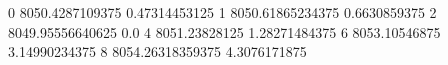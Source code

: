 0 8050.4287109375 0.47314453125
1 8050.61865234375 0.6630859375
2 8049.95556640625 0.0
4 8051.23828125 1.28271484375
6 8053.10546875 3.14990234375
8 8054.26318359375 4.3076171875
